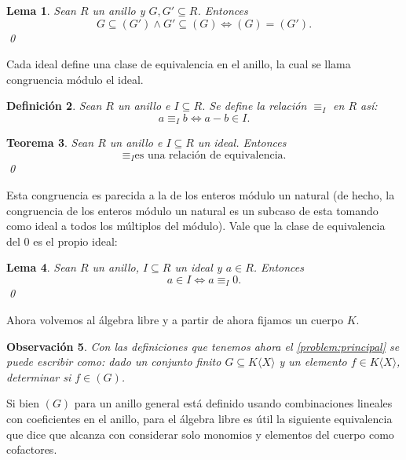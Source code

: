 \documentclass[12pt]{report}
\theoremstyle{customstyle}
\newtheorem{theorem}{Teorema}[chapter]
\newtheorem{definition}[theorem]{Definición}
\newtheorem{lemma}[theorem]{Lema}
\newtheorem{observation}[theorem]{Observación}
\theoremstyle{factstyle}
\begin{document}
\begin{lemma}\label{lemma:sub gen y sub gen ⇔ eq}
  Sean $R$ un anillo y $G, G' ⊆ R$. Entonces
  \[ G ⊆ (G') ∧ G' ⊆ (G) ⇔ (G) = (G') \text{.}\]
  \qed
\end{lemma}


Cada ideal define una clase de equivalencia en el anillo, la cual se llama congruencia módulo el ideal.

\begin{definition}\label{def:congruencia mod ideal}
  Sean $R$ un anillo e $I ⊆ R$. Se define la relación $≡_I$ en $R$ así:
  \[ a ≡_I b ⇔ a - b ∈ I \text{.}\]
\end{definition}

\begin{theorem}\label{thm:congruencia mod ideal es equivalencia}
  Sean $R$ un anillo e $I ⊆ R$ un ideal. Entonces
  \[ ≡_I \text{es una relación de equivalencia} \text{.}\]
  \qed
\end{theorem}

Esta congruencia es parecida a la de los enteros módulo un natural (de hecho, la congruencia de los enteros módulo un natural es un subcaso de esta tomando como ideal a todos los múltiplos del módulo). Vale que la clase de equivalencia del $0$ es el propio ideal:

\begin{lemma}\label{lemma:en ideal ⇔ congruente 0}
  Sean $R$ un anillo, $I ⊆ R$ un ideal y $a ∈ R$. Entonces
  \[ a ∈ I ⇔ a ≡_I 0 \text{.}\]
  \qed
\end{lemma}


Ahora volvemos al álgebra libre y a partir de ahora fijamos un cuerpo $K$.

\begin{observation}
  Con las definiciones que tenemos ahora el \cref{problem:principal} se puede escribir como: dado un conjunto finito $G ⊆ K⟨X⟩$ y un elemento $f ∈ K⟨X⟩$, determinar si $f ∈ (G)$.
\end{observation}

Si bien $(G)$ para un anillo general está definido usando combinaciones lineales con coeficientes en el anillo, para el álgebra libre es útil la siguiente equivalencia que dice que alcanza con considerar solo monomios y elementos del cuerpo como cofactores.
\end{document}
